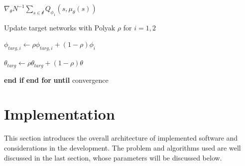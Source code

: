 \documentclass[oneside,11pt,a4paper]{article}
\begin{document}
\begin{algorithm}[H]
\begin{algorithmic}[1]
        \begin{center}
            $\nabla_\theta N^{-1}\sum\limits_{s\in\mathcal b}Q_{\phi_1}(s,\mu_\theta(s))$
        \end{center}
        \STATE \hspace{1.5cm} Update target networks with Polyak $\rho$ for $i=1,2$
        \begin{center}
            $\phi_{targ,i}\leftarrow \rho\phi_{targ,i} + (1-\rho)\phi_i$
        \end{center}
        \begin{center}
            $\theta_{targ}\leftarrow \rho\theta_{targ} + (1-\rho)\theta$
        \end{center}
        \STATE \hspace{1cm} \textbf{end if}
        \STATE \hspace{0.5cm} \textbf{end for}
        \STATE \textbf{until} convergence

    \end{algorithmic}
\end{algorithm}
\vspace{0.5cm}

\section{Implementation}
This section introduces the overall architecture of implemented software and considerations in the development. The problem and algorithms used are well discussed in the last section, whose parameters will be discussed below.
\end{document}
